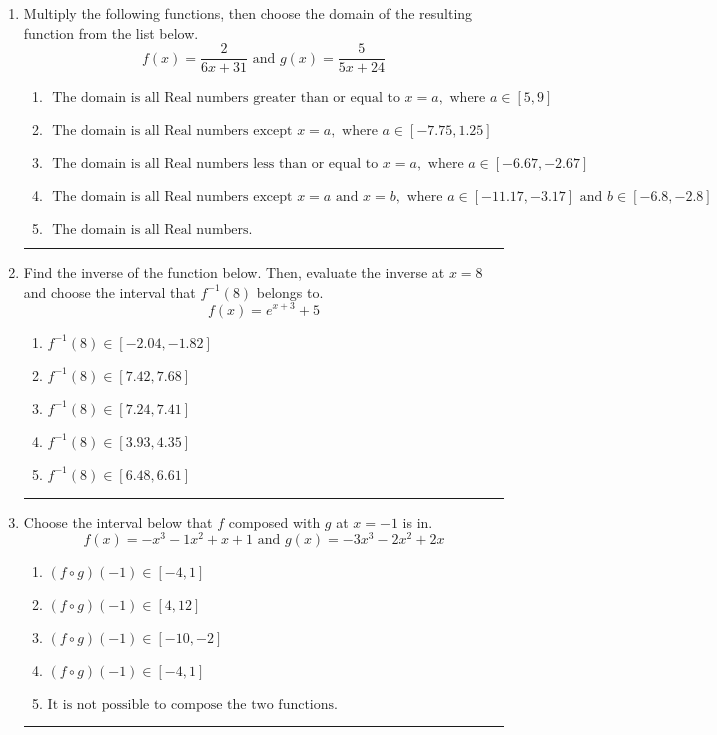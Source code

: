\documentclass[14pt]{extbook}
\newcommand{\litem}[1]{\item#1\hspace*{-1cm}\rule{\textwidth}{0.4pt}}
\begin{document}
\begin{enumerate}
{\begin{enumerate}[label=\Alph*.]
\end{enumerate} }
\litem{
Multiply the following functions, then choose the domain of the resulting function from the list below.\[ f(x) = \frac{2}{6x+31} \text{ and } g(x) = \frac{5}{5x+24} \]\begin{enumerate}[label=\Alph*.]
\item \( \text{ The domain is all Real numbers greater than or equal to } x = a, \text{ where } a \in [5, 9] \)
\item \( \text{ The domain is all Real numbers except } x = a, \text{ where } a \in [-7.75, 1.25] \)
\item \( \text{ The domain is all Real numbers less than or equal to } x = a, \text{ where } a \in [-6.67, -2.67] \)
\item \( \text{ The domain is all Real numbers except } x = a \text{ and } x = b, \text{ where } a \in [-11.17, -3.17] \text{ and } b \in [-6.8, -2.8] \)
\item \( \text{ The domain is all Real numbers. } \)

\end{enumerate} }
\litem{
Find the inverse of the function below. Then, evaluate the inverse at $x = 8$ and choose the interval that $f^{-1}(8)$ belongs to.\[ f(x) = e^{x+3}+5 \]\begin{enumerate}[label=\Alph*.]
\item \( f^{-1}(8) \in [-2.04, -1.82] \)
\item \( f^{-1}(8) \in [7.42, 7.68] \)
\item \( f^{-1}(8) \in [7.24, 7.41] \)
\item \( f^{-1}(8) \in [3.93, 4.35] \)
\item \( f^{-1}(8) \in [6.48, 6.61] \)

\end{enumerate} }
\litem{
Choose the interval below that $f$ composed with $g$ at $x=-1$ is in.\[ f(x) = -x^{3} -1 x^{2} +x + 1 \text{ and } g(x) = -3x^{3} -2 x^{2} +2 x \]\begin{enumerate}[label=\Alph*.]
\item \( (f \circ g)(-1) \in [-4, 1] \)
\item \( (f \circ g)(-1) \in [4, 12] \)
\item \( (f \circ g)(-1) \in [-10, -2] \)
\item \( (f \circ g)(-1) \in [-4, 1] \)
\item \( \text{It is not possible to compose the two functions.} \)


\end{enumerate}}
\end{enumerate}
\end{document}
